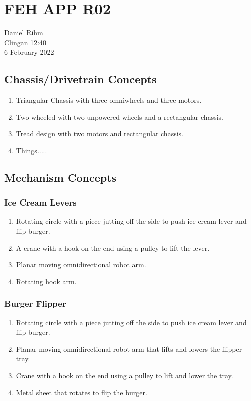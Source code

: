 \documentclass[12pt]{extarticle}
\begin{document}
\section*{FEH APP R02}

Daniel Rihm\\
Clingan 12:40\\
6 February 2022

\subsection*{Chassis/Drivetrain Concepts}
\begin{enumerate}
    \item Triangular Chassis with three omniwheels and three motors.
    \item Two wheeled with two unpowered wheels and a rectangular chassis.
    \item Tread design with two motors and rectangular chassis.
    \item Things.....
\end{enumerate}

\subsection*{Mechanism Concepts}
\subsubsection*{Ice Cream Levers}
\begin{enumerate}
    \item Rotating circle with a piece jutting off the side to push ice cream lever and flip burger.
    \item A crane with a hook on the end using a pulley to lift the lever.
    \item Planar moving omnidirectional robot arm.
    \item Rotating hook arm.
\end{enumerate}

\subsubsection*{Burger Flipper}
\begin{enumerate}
    \item Rotating circle with a piece jutting off the side to push ice cream lever and flip burger.
    \item Planar moving omnidirectional robot arm that lifts and lowers the flipper tray.
    \item Crane with a hook on the end using a pulley to lift and lower the tray.
    \item Metal sheet that rotates to flip the burger.
\end{enumerate}
\end{document}
